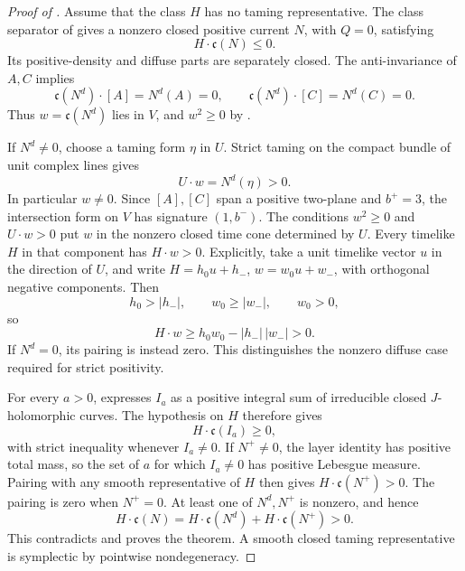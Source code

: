 \begin{proof}[Proof of ]
Assume that the class \(H\) has no taming representative.
The class separator of  gives a nonzero
closed positive current \(N\), with \(Q=0\), satisfying
\begin{equation}\label{eq:density-cone-separator}
 H\cdot\mathfrak c(N)\le0.
\end{equation}
Its positive-density and diffuse parts are separately closed.
The anti-invariance of \(A,C\) implies
\[
 \mathfrak c(N^d)\cdot[A]=N^d(A)=0,\qquad
 \mathfrak c(N^d)\cdot[C]=N^d(C)=0.
\]
Thus \(w=\mathfrak c(N^d)\) lies in \(V\), and
\(w^2\ge0\) by .

If \(N^d\ne0\), choose a taming form \(\eta\) in \(U\).  Strict
taming on the compact bundle of unit complex lines gives
\[
 U\cdot w=N^d(\eta)>0.
\]
In particular \(w\ne0\).  Since \([A],[C]\) span a positive
two-plane and \(b^+=3\), the intersection form on \(V\) has signature
\((1,b^-)\).  The conditions \(w^2\ge0\) and \(U\cdot w>0\) put
\(w\) in the nonzero closed time cone determined by \(U\).
Every timelike \(H\) in that component has \(H\cdot w>0\).
Explicitly, take a unit timelike vector \(u\) in the direction of
\(U\), and write \(H=h_0u+h_-\), \(w=w_0u+w_-\), with orthogonal
negative components.  Then
\[
 h_0>|h_-|,\qquad w_0\ge|w_-|,\qquad w_0>0,
\]
so
\[
 H\cdot w\ge h_0w_0-|h_-|\,|w_-|>0.
\]
If \(N^d=0\), its pairing is instead zero.  This distinguishes the
nonzero diffuse case required for strict positivity.

For every \(a>0\),  expresses
\(I_a\) as a positive integral sum of irreducible closed
\(J\)-holomorphic curves.  The hypothesis on \(H\) therefore gives
\[
 H\cdot\mathfrak c(I_a)\ge0,
\]
with strict inequality whenever \(I_a\ne0\).
If \(N^+\ne0\), the layer identity has positive total mass, so the
set of \(a\) for which \(I_a\ne0\) has positive Lebesgue measure.
Pairing  with any smooth representative
of \(H\) then gives \(H\cdot\mathfrak c(N^+)>0\).
The pairing is zero when \(N^+=0\).
At least one of \(N^d,N^+\) is nonzero, and hence
\[
 H\cdot\mathfrak c(N)
 =H\cdot\mathfrak c(N^d)+H\cdot\mathfrak c(N^+)>0.
\]
This contradicts  and proves the
theorem.  A smooth closed taming representative is symplectic by
pointwise nondegeneracy.
\end{proof}
